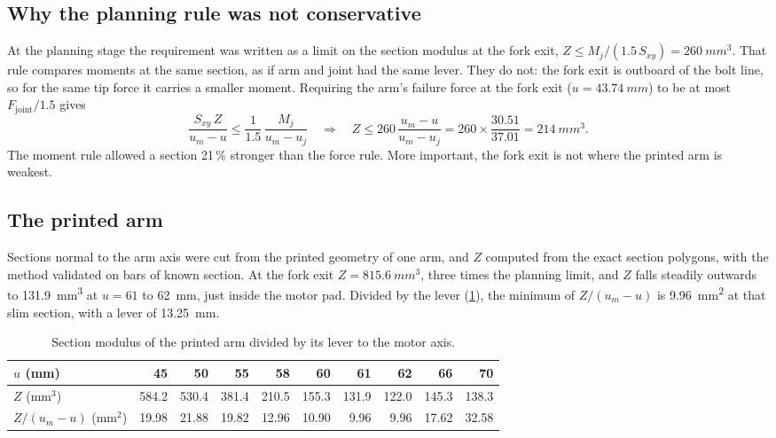 \subsection{Why the planning rule was not conservative}

At the planning stage the requirement was written as a limit on the section modulus at the fork exit, $Z \leq M_j/(1.5\,S_{xy}) = \SI{260}{mm^3}$. That rule compares moments at the same section, as if arm and joint had the same lever. They do not: the fork exit is outboard of the bolt line, so for the same tip force it carries a smaller moment. Requiring the arm's failure force at the fork exit ($u = \SI{43.74}{mm}$) to be at most $F_\text{joint}/1.5$ gives
\begin{equation}
\frac{S_{xy}\, Z}{u_m - u} \leq \frac{1}{1.5}\,\frac{M_j}{u_m - u_j} \quad\Rightarrow\quad Z \leq 260\,\frac{u_m - u}{u_m - u_j} = 260 \times \frac{30.51}{37.01} = \SI{214}{mm^3}.
\end{equation}
The moment rule allowed a section 21\,\% stronger than the force rule. More important, the fork exit is not where the printed arm is weakest.

\subsection{The printed arm}

Sections normal to the arm axis were cut from the printed geometry of one arm, and $Z$ computed from the exact section polygons, with the method validated on bars of known section. At the fork exit $Z = \SI{815.6}{mm^3}$, three times the planning limit, and $Z$ falls steadily outwards to \SI{131.9}{mm^3} at $u = 61$ to \SI{62}{mm}, just inside the motor pad. Divided by the lever (\cref{tab:cap-lever}), the minimum of $Z/(u_m - u)$ is \SI{9.96}{mm^2} at that slim section, with a lever of \SI{13.25}{mm}.

\begin{table}[htbp]
\centering\small
\caption{Section modulus of the printed arm divided by its lever to the motor axis.}\label{tab:cap-lever}
\begin{tabular}{@{}lrrrrrrrrr@{}}
\toprule
$u$ (mm) & 45 & 50 & 55 & 58 & 60 & 61 & 62 & 66 & 70\\
\midrule
$Z$ (mm$^3$) & 584.2 & 530.4 & 381.4 & 210.5 & 155.3 & 131.9 & 122.0 & 145.3 & 138.3\\
$Z/(u_m - u)$ (mm$^2$) & 19.98 & 21.88 & 19.82 & 12.96 & 10.90 & 9.96 & 9.96 & 17.62 & 32.58\\
\bottomrule
\end{tabular}
\end{table}

